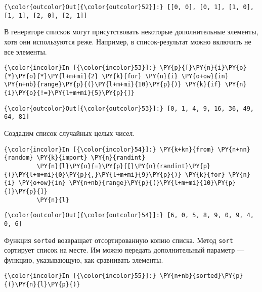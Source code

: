             \begin{Verbatim}[commandchars=\\\{\}]
{\color{outcolor}Out[{\color{outcolor}52}]:} [[0, 0], [0, 1], [1, 0], [1, 1], [2, 0], [2, 1]]
\end{Verbatim}
        
    В генераторе списков могут присутствовать некоторые дополнительные
элементы, хотя они используются реже. Например, в список-результат можно
включить не все элементы.

    \begin{Verbatim}[commandchars=\\\{\}]
{\color{incolor}In [{\color{incolor}53}]:} \PY{p}{[}\PY{n}{i}\PY{o}{*}\PY{o}{*}\PY{l+m+mi}{2} \PY{k}{for} \PY{n}{i} \PY{o+ow}{in} \PY{n+nb}{range}\PY{p}{(}\PY{l+m+mi}{10}\PY{p}{)} \PY{k}{if} \PY{n}{i}\PY{o}{!=}\PY{l+m+mi}{5}\PY{p}{]}
\end{Verbatim}

            \begin{Verbatim}[commandchars=\\\{\}]
{\color{outcolor}Out[{\color{outcolor}53}]:} [0, 1, 4, 9, 16, 36, 49, 64, 81]
\end{Verbatim}
        
    Создадим список случайных целых чисел.

    \begin{Verbatim}[commandchars=\\\{\}]
{\color{incolor}In [{\color{incolor}54}]:} \PY{k+kn}{from} \PY{n+nn}{random} \PY{k}{import} \PY{n}{randint}
         \PY{n}{l}\PY{o}{=}\PY{p}{[}\PY{n}{randint}\PY{p}{(}\PY{l+m+mi}{0}\PY{p}{,}\PY{l+m+mi}{9}\PY{p}{)} \PY{k}{for} \PY{n}{i} \PY{o+ow}{in} \PY{n+nb}{range}\PY{p}{(}\PY{l+m+mi}{10}\PY{p}{)}\PY{p}{]}
         \PY{n}{l}
\end{Verbatim}

            \begin{Verbatim}[commandchars=\\\{\}]
{\color{outcolor}Out[{\color{outcolor}54}]:} [6, 0, 5, 8, 9, 0, 9, 4, 0, 6]
\end{Verbatim}
        
    Функция \texttt{sorted} возвращает отсортированную копию списка. Метод
\texttt{sort} сортирует список на месте. Им можно передать
дополнительный параметр --- функцию, указывающую, как сравнивать элементы.

    \begin{Verbatim}[commandchars=\\\{\}]
{\color{incolor}In [{\color{incolor}55}]:} \PY{n+nb}{sorted}\PY{p}{(}\PY{n}{l}\PY{p}{)}
\end{Verbatim}

